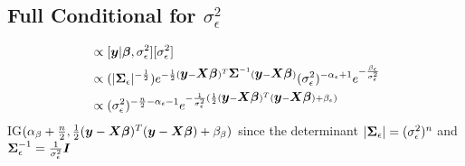 \documentclass[fleqn]{article}
\def\bm#1{\mbox{\boldmath $#1$}}
\begin{document}
\subsection{Full Conditional for $\sigma^2_\epsilon$}
%
\begin{align*}
[\sigma^2_\epsilon | \cdot] & \propto [\bm{y} | \bm{\beta}, \sigma^2_\epsilon] [\sigma^2_\epsilon]\\
%
& \propto (|\bm{\Sigma}_\epsilon |^{ - \frac{1} {2}}) e^{ - \frac{1} {2} (\bm{y} - \bm{X} \bm{\beta})^T \bm{\Sigma}^{ - 1} (\bm{y} - \bm{X} \bm{\beta})} (\sigma^2_\epsilon)^{ - \alpha_\epsilon + 1} e^{ - \frac{\beta_\epsilon} {\sigma^2_\epsilon}}\\
%
& \propto (\sigma^2_\epsilon)^{ -\frac{n} {2} - \alpha_\epsilon - 1} e^{ - \frac{1} {\sigma^2_\epsilon} ( \frac{1} {2} (\bm{y} - \bm{X} \bm{\beta})^T (\bm{y} - \bm{X} \bm{\beta}) + \beta_\epsilon)}
\end{align*}
% 
 IG$(\alpha_\beta + \frac{n} {2}, \frac{1} {2} (\bm{y} - \bm{X} \bm{\beta})^T (\bm{y} - \bm{X} \bm{\beta}) + \beta_\beta)$ since the determinant $|\bm{\Sigma}_\epsilon| = (\sigma^2_\epsilon)^{n}$ and $\bm{\Sigma}_\epsilon^{ - 1} = \frac{1} {\sigma^2_\epsilon} \bm{I}$
%
\end{document}
